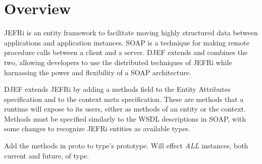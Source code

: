 \documentclass{article}
\begin{document}

\tableofcontents
\newpage
\linespread{1.6}

\section{Overview}
JEFRi is an entity framework to facilitate moving highly structured data
between applications and application instances. SOAP is a technique for making
remote procedure calls between a client and a server. DJEF extends and
combines the two, allowing developers to use the distributed techniques of JEFRi
while harnassing the power and flexibility of a SOAP architecture.

DJEF extends JEFRi by adding a methods field to the Entity Attributes
specification and to the context meta specification. These are methods that a
runtime will expose to its users, either as methods of an entity or the context.
Methods must be specified similarly to the WSDL descriptions in SOAP, with some
changes to recognize JEFRi entities as available types.

	{Add the methods in proto to type's prototype. Will effect {\it ALL}
	instances, both current and future, of {\ilcode type}. }
	{
	}
\end{document}
